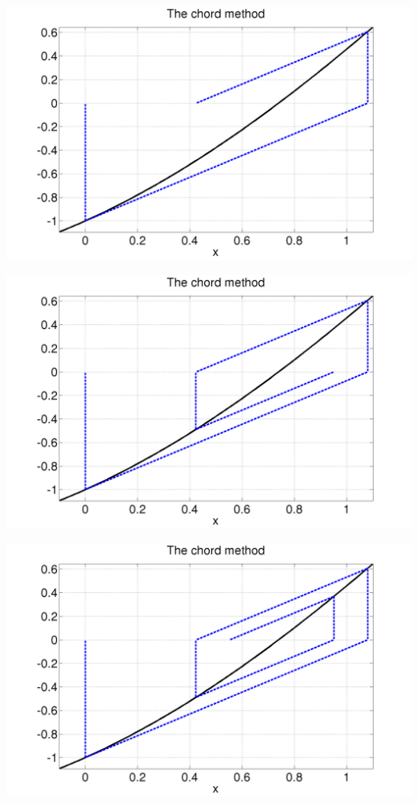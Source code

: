 \documentclass{beamer}
\begin{document}
\begin{frame}
\begin{columns}
\begin{column}{0.5\textwidth}
\begin{overlayarea}{\textwidth}{0.6\textheight}
        {
          \begin{center}
            \includegraphics[width=\textwidth]{figures/ChordMap3}
          \end{center}
        }
        {
          \begin{center}
            \includegraphics[width=\textwidth]{figures/ChordMap4}
          \end{center}
        }
        {
          \begin{center}
            \includegraphics[width=\textwidth]{figures/ChordMap5}

\end{center}}
\end{overlayarea}
\end{column}
\end{columns}
\end{frame}
\end{document}
